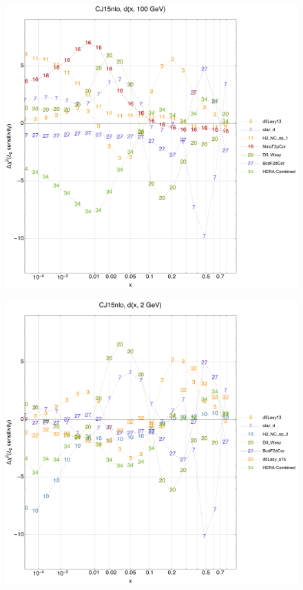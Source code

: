 \documentclass[10pt,aps,prd,floatfix,titlepage]{revtex4}
\begin{document}
\clearpage
\begin{figure}
\includegraphics[width=\textwidth,height=0.44\textheight,keepaspectratio]{1/ifl1_CJ15nlo_L2_q100_Sf_1.pdf}
\caption{}
\end{figure}
\begin{figure}
\includegraphics[width=\textwidth,height=0.44\textheight,keepaspectratio]{1/ifl1_CJ15nlo_L2_q2_Sf_1.pdf}
\caption{}
\end{figure}
\end{document}

